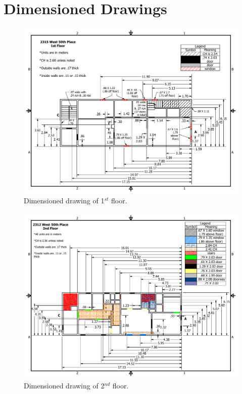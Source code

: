 \documentclass[11pt,oneside]{book}
\begin{document}


\appendix

\chapter{Dimensioned Drawings}

\begin{figure}[h!]
\centering
\includegraphics[width=.80\textwidth]{../Figures/50th_Place_1st_Floor}
\caption {Dimensioned drawing of 1$^{st}$ floor.}
\label{fig:first_floor}
\end{figure}

\begin{figure}[h!]
\centering
\includegraphics[width=.80\textwidth]{../Figures/50th_Place_2nd_Floor}
\caption {Dimensioned drawing of 2$^{nd}$ floor.}
\label{fig:second_floor}
\end{figure}
\end{document}
